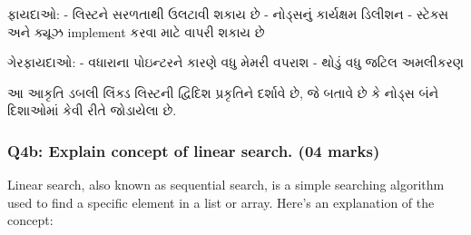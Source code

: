 ફાયદાઓ: - લિસ્ટને સરળતાથી ઉલટાવી શકાય છે - નોડ્સનું કાર્યક્ષમ ડિલીશન - સ્ટેક્સ અને
ક્યૂઝ implement કરવા માટે વાપરી શકાય છે

ગેરફાયદાઓ: - વધારાના પોઇન્ટરને કારણે વધુ મેમરી વપરાશ - થોડું વધુ જટિલ અમલીકરણ

\begin{Shaded}
\begin{Highlighting}[]
\end{Highlighting}
\end{Shaded}

આ આકૃતિ ડબલી લિંક્ડ લિસ્ટની દ્વિદિશ પ્રકૃતિને દર્શાવે છે, જે બતાવે છે કે નોડ્સ બંને
દિશાઓમાં કેવી રીતે જોડાયેલા છે.

\hypertarget{q4b-explain-concept-of-linear-search.-04-marks}{%
\subsubsection{Q4b: Explain concept of linear search. (04
marks)}\label{q4b-explain-concept-of-linear-search.-04-marks}}

Linear search, also known as sequential search, is a simple searching
algorithm used to find a specific element in a list or array. Here's an
explanation of the concept:

